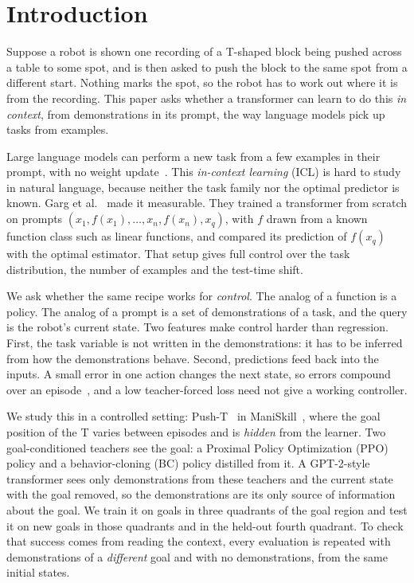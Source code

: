 \providecommand{\inprogress}[1]{\textcolor{red}{[In progress: #1]}}
\section{Introduction}
\label{sec:intro}

Suppose a robot is shown one recording of a T-shaped block being pushed across a table to some spot, and is then asked to push the
block to the same spot from a different start. Nothing marks the spot, so the robot has to work out where it is from the recording.
This paper asks whether a transformer can learn to do this \emph{in context}, from demonstrations in its prompt, the way language
models pick up tasks from examples.

Large language models can perform a new task from a few examples in their prompt, with no weight update~\cite{brown2020language}.
This \emph{in-context learning} (ICL) is hard to study in natural language, because neither the task family nor the optimal
predictor is known. Garg et al.~\cite{garg2022can} made it measurable. They trained a transformer from scratch on prompts
$(x_1, f(x_1), \dots, x_n, f(x_n), x_q)$, with $f$ drawn from a known function class such as linear functions, and compared its
prediction of $f(x_q)$ with the optimal estimator. That setup gives full control over the task distribution, the number of
examples and the test-time shift.

We ask whether the same recipe works for \emph{control}. The analog of a function is a policy. The analog of a prompt is a set of
demonstrations of a task, and the query is the robot's current state. Two features make control harder than regression. First,
the task variable is not written in the demonstrations: it has to be inferred from how the demonstrations behave. Second,
predictions feed back into the inputs. A small error in one action changes the next state, so errors compound over an
episode~\cite{ross2010efficient}, and a low teacher-forced loss need not give a working controller.

We study this in a controlled setting: Push-T~\cite{florence2021implicit} in ManiSkill~\cite{tao2024maniskill3}, where the goal
position of the T varies between episodes and is \emph{hidden} from the learner. Two goal-conditioned teachers see the goal: a Proximal
Policy Optimization (PPO) policy and a behavior-cloning (BC) policy distilled from it. A GPT-2-style transformer sees only demonstrations from these
teachers and the current state with the goal removed, so the demonstrations are its only source of information about the goal.
We train it on goals in three quadrants of the goal region and test it on new goals in those quadrants and in the held-out
fourth quadrant. To check that success comes from reading the context, every evaluation is repeated with demonstrations of a
\emph{different} goal and with no demonstrations, from the same initial states.

